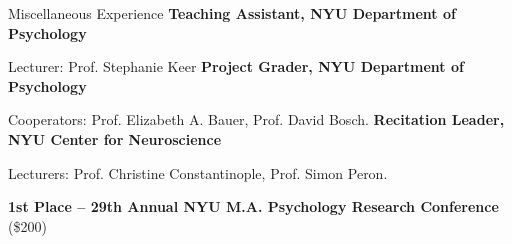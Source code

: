 \begin{rubric}{Miscellaneous Experience}
\textbf{Teaching Assistant, NYU Department of Psychology}

Lecturer: Prof. Stephanie Keer
%
\entry*[May 2024]\textbf{Project Grader, NYU Department of Psychology}

Cooperators: Prof. Elizabeth A. Bauer, Prof. David Bosch.
%
\textbf{Recitation Leader, NYU Center for Neuroscience}

Lecturers: Prof. Christine Constantinople, Prof. Simon Peron.


\entry*[Apr 2025]
\textbf{1st Place – 29th Annual NYU M.A. Psychology Research Conference} (\$200)
  

\end{rubric}